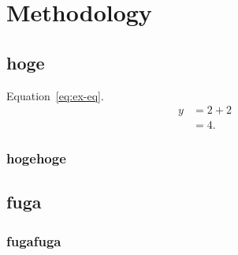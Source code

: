 \chapter{Methodology}\label{ch:methodology}
\section{hoge}
    Equation~\ref{eq:ex-eq}.
    \begin{equation}
        \begin{split}
            y &= 2 + 2 \\
            &= 4.
        \end{split}
        \label{eq:ex-eq}
    \end{equation}
\subsection{hogehoge}
\section{fuga}
\subsection{fugafuga}